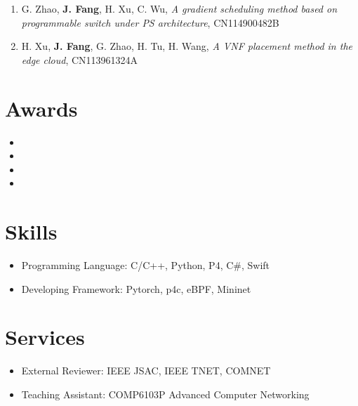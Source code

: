 \documentclass{resume}
\begin{document}
\begin{enumerate}
  \item G. Zhao, \textbf{J. Fang}, H. Xu, C. Wu, \textit{A gradient scheduling method based on programmable switch under PS architecture}, CN114900482B
  \item H. Xu, \textbf{J. Fang}, G. Zhao, H. Tu, H. Wang, \textit{A VNF placement method in the edge cloud}, CN113961324A
\end{enumerate}



\section{Awards}

\begin{itemize}[parsep=0.5ex]
  \item {}
  \item {}
  \item {}
  \item {}
\end{itemize}

\section{Skills}

\begin{itemize}[parsep=0.5ex]
  \item Programming Language: C/C++, Python, P4, C\#, Swift
  \item Developing Framework: Pytorch, p4c, eBPF, Mininet
\end{itemize}

\section{Services}

\begin{itemize}[parsep=0.5ex]
  \item External Reviewer: IEEE JSAC, IEEE TNET, COMNET
  \item Teaching Assistant: COMP6103P Advanced Computer Networking
\end{itemize}
\end{document}
